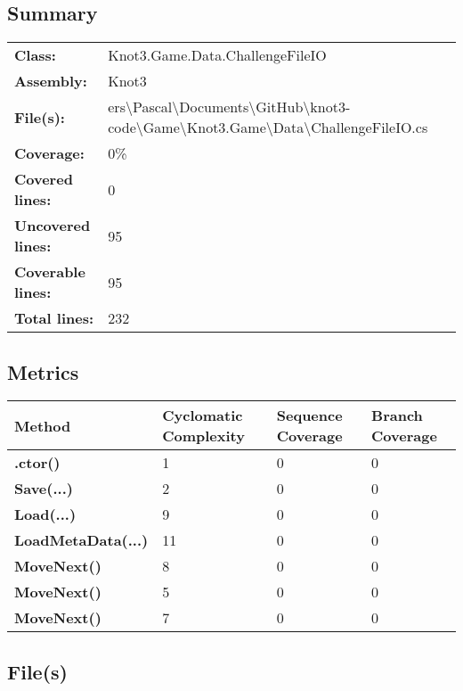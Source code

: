 \documentclass[a4paper,10pt]{article}
\begin{document}
\subsection{Summary}
\begin{longtable}[l]{ll}
\textbf{Class:} & Knot3.Game.Data.ChallengeFileIO\\
\textbf{Assembly:} & Knot3\\
\textbf{File(s):} & \begin{minipage}[t]{12cm}{ers\textbackslash Pascal\textbackslash Documents\textbackslash GitHub\textbackslash knot3-code\textbackslash Game\textbackslash Knot3.Game\textbackslash Data\textbackslash ChallengeFileIO.cs}\end{minipage} \\
\textbf{Coverage:} & 0\%\\
\textbf{Covered lines:} & 0\\
\textbf{Uncovered lines:} & 95\\
\textbf{Coverable lines:} & 95\\
\textbf{Total lines:} & 232\\
\end{longtable}
\subsection{Metrics}
\begin{longtable}[l]{|l|l|l|l|}
\hline
\textbf{Method} & \textbf{Cyclomatic Complexity} & \textbf{Sequence Coverage} & \textbf{Branch Coverage}\\
\hline
\textbf{.ctor()} & 1 & 0 & 0\\
\hline
\textbf{Save(...)} & 2 & 0 & 0\\
\hline
\textbf{Load(...)} & 9 & 0 & 0\\
\hline
\textbf{LoadMetaData(...)} & 11 & 0 & 0\\
\hline
\textbf{MoveNext()} & 8 & 0 & 0\\
\hline
\textbf{MoveNext()} & 5 & 0 & 0\\
\hline
\textbf{MoveNext()} & 7 & 0 & 0\\
\hline
\end{longtable}
\subsection{File(s)}
\end{document}
